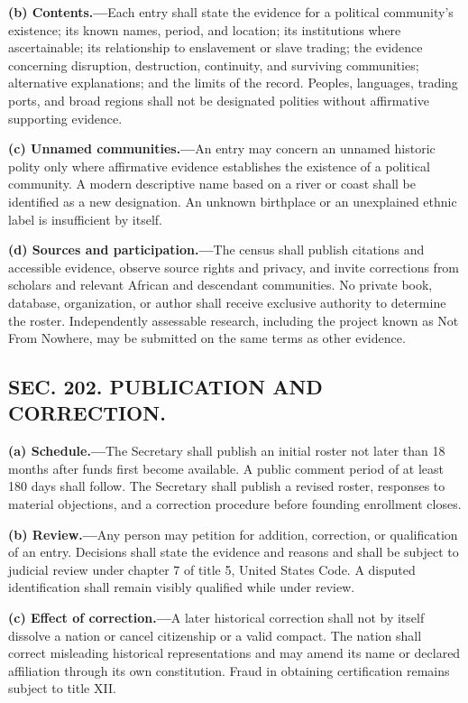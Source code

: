 \documentclass[12pt,letterpaper]{article}
\begin{document}
\textbf{(b) Contents.---}Each entry shall state the evidence for a political community's existence; its known names, period, and location; its institutions where ascertainable; its relationship to enslavement or slave trading; the evidence concerning disruption, destruction, continuity, and surviving communities; alternative explanations; and the limits of the record. Peoples, languages, trading ports, and broad regions shall not be designated polities without affirmative supporting evidence.

\textbf{(c) Unnamed communities.---}An entry may concern an unnamed historic polity only where affirmative evidence establishes the existence of a political community. A modern descriptive name based on a river or coast shall be identified as a new designation. An unknown birthplace or an unexplained ethnic label is insufficient by itself.

\textbf{(d) Sources and participation.---}The census shall publish citations and accessible evidence, observe source rights and privacy, and invite corrections from scholars and relevant African and descendant communities. No private book, database, organization, or author shall receive exclusive authority to determine the roster. Independently assessable research, including the project known as Not From Nowhere, may be submitted on the same terms as other evidence.

\subsection*{SEC. 202. PUBLICATION AND CORRECTION.}

\textbf{(a) Schedule.---}The Secretary shall publish an initial roster not later than 18 months after funds first become available. A public comment period of at least 180 days shall follow. The Secretary shall publish a revised roster, responses to material objections, and a correction procedure before founding enrollment closes.

\textbf{(b) Review.---}Any person may petition for addition, correction, or qualification of an entry. Decisions shall state the evidence and reasons and shall be subject to judicial review under chapter 7 of title 5, United States Code. A disputed identification shall remain visibly qualified while under review.

\textbf{(c) Effect of correction.---}A later historical correction shall not by itself dissolve a nation or cancel citizenship or a valid compact. The nation shall correct misleading historical representations and may amend its name or declared affiliation through its own constitution. Fraud in obtaining certification remains subject to title XII.
\end{document}
